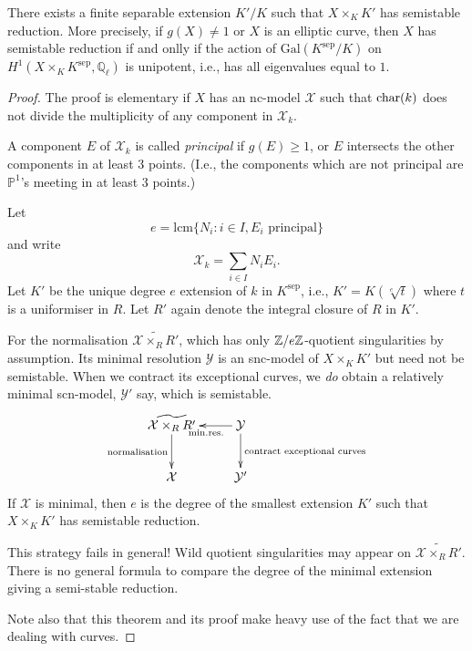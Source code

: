 \begin{theorem}
There exists a finite separable extension $K'/K$ such that $X \times_K K'$ has semistable reduction. More precisely, if $g(X) \neq 1$ or $X$ is an elliptic curve, then $X$ has semistable reduction if and onlly if the action of $\mathrm{Gal}(K^{\mathrm{sep}}/K)$ on $H^1(X\times_K K^{\mathrm{sep}},\mathbb{Q}_{\ell})$ is unipotent, i.e., has all eigenvalues equal to $1$.\end{theorem}

\begin{proof} The proof is elementary if $X$ has an nc-model $\mathcal{X}$ such that $\mathrm{char}(k)$ does not divide the multiplicity of any component in $\mathcal{X}_k$.

A component $E$ of $\mathcal{X}_k$ is called \emph{principal} if $g(E) \geq 1$, or $E$ intersects the other components in at least $3$ points. (I.e., the components which are not principal are $\mathbb{P}^1$'s meeting in at least $3$ points.)

Let $$e = \mathrm{lcm}\{N_i \colon i \in I, E_i \textrm{  principal}\}$$ and write $$\mathcal{X}_k = \sum_{i \in I}N_iE_i.$$ Let $K'$ be the unique degree $e$ extension of $k$ in $K^{\mathrm{sep}}$, i.e., $K' = K(\sqrt[e]{t})$ where $t$ is a uniformiser in $R$. Let $R'$ again denote the integral closure of $R$ in $K'$.

For the normalisation $\widetilde{\mathcal{X} \times_R R'}$, which has only $\mathbb{Z}/e\mathbb{Z}$-quotient singularities by assumption. Its minimal resolution $\mathcal{Y}$ is an snc-model of $X \times_K K'$ but need not be semistable. When we contract its exceptional curves, we \emph{do} obtain a relatively minimal scn-model, $\mathcal{Y}'$ say, which is semistable.
\[
\xymatrix{
\widetilde{\mathcal{X}\times_R R'} \ar[d]_{\mathrm{normalisation}} & \ar[l]^{\mathrm{min. res.}} \mathcal{Y} \ar[d]^{\textrm{contract exceptional curves}} \\
\mathcal{X} & \mathcal{Y}' 
}
\]
If $\mathcal{X}$ is minimal, then $e$ is the degree of the smallest extension $K'$ such that $X \times_K K'$ has semistable reduction.

This strategy fails in general! Wild quotient singularities may appear on $\widetilde{\mathcal{X} \times_R R'}$. There is no general formula to compare the degree of the minimal extension giving a semi-stable reduction.

Note also that this theorem and its proof make heavy use of the fact that we are dealing with curves.
\end{proof}

